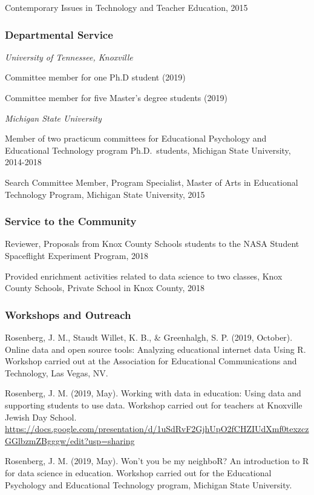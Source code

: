 \documentclass[14,]{article}
\begin{document}
Contemporary Issues in Technology and Teacher Education, 2015

\subsubsection{Departmental Service}\label{departmental-service}

\emph{University of Tennessee, Knoxville}

Committee member for one Ph.D student (2019)

Committee member for five Master's degree students (2019)

\emph{Michigan State University}

Member of two practicum committees for Educational Psychology and
Educational Technology program Ph.D.~students, Michigan State
University, 2014-2018

Search Committee Member, Program Specialist, Master of Arts in
Educational Technology Program, Michigan State University, 2015

\subsubsection{Service to the
Community}\label{service-to-the-community-1}

Reviewer, Proposals from Knox County Schools students to the NASA
Student Spaceflight Experiment Program, 2018

Provided enrichment activities related to data science to two classes,
Knox County Schools, Private School in Knox County, 2018

\subsubsection{Workshops and Outreach}\label{workshops-and-outreach}

Rosenberg, J. M., Staudt Willet, K. B., \& Greenhalgh, S. P. (2019,
October). Online data and open source tools: Analyzing educational
internet data Using R. Workshop carried out at the Association for
Educational Communications and Technology, Las Vegas, NV.

Rosenberg, J. M. (2019, May). Working with data in education: Using data
and supporting students to use data. Workshop carried out for teachers
at Knoxville Jewish Day School.
\url{https://docs.google.com/presentation/d/1uSdRvF2GjhUpO2fCHZIUdXmf0texzczGGlbzmZBgggw/edit?usp=sharing}

Rosenberg, J. M. (2019, May). Won't you be my neighboR? An introduction
to R for data science in education. Workshop carried out for the
Educational Psychology and Educational Technology program, Michigan
State University.
\end{document}
